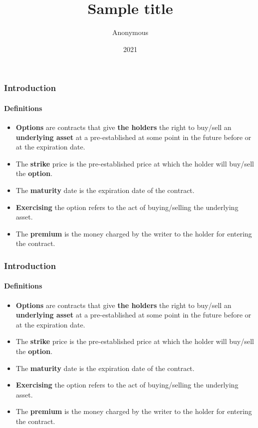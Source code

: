 \documentclass{beamer}
\title{Sample title}
\author{Anonymous}
\institute{Overleaf}
\date{2021}
\begin{document}
\frame{\titlepage}

\begin{frame}
\frametitle{Introduction}
\framesubtitle{Definitions}

\begin{itemize}
    \item \textbf{Options} are contracts that give \textbf{the holders} the right to buy/sell an \textbf{underlying asset} at a pre-established at some point in the future before or at the expiration date.
    
    \item The \textbf{strike} price is the pre-established price at which the holder will buy/sell the \textbf{option}.

    \item The \textbf{maturity} date is the expiration date of the contract.

    \item \textbf{Exercising} the option refers to the act of buying/selling the underlying asset.

    \item The \textbf{premium} is the money charged by the writer to the holder for entering the contract.
\end{itemize}

\end{frame}

\begin{frame}
    \frametitle{Introduction}
    \framesubtitle{Definitions}
    
    \begin{itemize}
        \item \textbf{Options} are contracts that give \textbf{the holders} the right to buy/sell an \textbf{underlying asset} at a pre-established at some point in the future before or at the expiration date.
        
        \item The \textbf{strike} price is the pre-established price at which the holder will buy/sell the \textbf{option}.
    
        \item The \textbf{maturity} date is the expiration date of the contract.
    
        \item \textbf{Exercising} the option refers to the act of buying/selling the underlying asset.
    
        \item The \textbf{premium} is the money charged by the writer to the holder for entering the contract.
    \end{itemize}
    
\end{frame}
\end{document}
